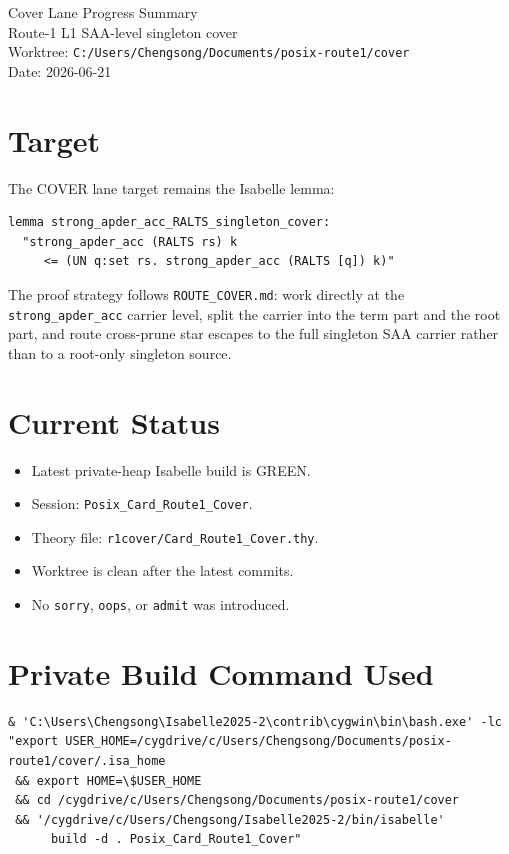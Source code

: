\documentclass[11pt]{article}
\newcommand{\code}[1]{\texttt{\small #1}}
\newcommand{\green}{\textcolor{green!45!black}{GREEN}}
\begin{document}
\begin{center}
  {\LARGE Cover Lane Progress Summary}\\[0.25em]
  {\large Route-1 L1 SAA-level singleton cover}\\[0.25em]
  {\small Worktree: \code{C:/Users/Chengsong/Documents/posix-route1/cover}}\\
  {\small Date: 2026-06-21}
\end{center}

\section*{Target}

The COVER lane target remains the Isabelle lemma:

\begin{verbatim}
lemma strong_apder_acc_RALTS_singleton_cover:
  "strong_apder_acc (RALTS rs) k
     <= (UN q:set rs. strong_apder_acc (RALTS [q]) k)"
\end{verbatim}

The proof strategy follows \code{ROUTE\_COVER.md}: work directly at the
\code{strong\_apder\_acc} carrier level, split the carrier into the term part
and the root part, and route cross-prune star escapes to the full singleton
SAA carrier rather than to a root-only singleton source.

\section*{Current Status}

\begin{itemize}
  \item Latest private-heap Isabelle build is \green.
  \item Session: \code{Posix\_Card\_Route1\_Cover}.
  \item Theory file: \code{r1cover/Card\_Route1\_Cover.thy}.
  \item Worktree is clean after the latest commits.
  \item No \code{sorry}, \code{oops}, or \code{admit} was introduced.
\end{itemize}

\section*{Private Build Command Used}

\begin{verbatim}
& 'C:\Users\Chengsong\Isabelle2025-2\contrib\cygwin\bin\bash.exe' -lc
"export USER_HOME=/cygdrive/c/Users/Chengsong/Documents/posix-route1/cover/.isa_home
 && export HOME=\$USER_HOME
 && cd /cygdrive/c/Users/Chengsong/Documents/posix-route1/cover
 && '/cygdrive/c/Users/Chengsong/Isabelle2025-2/bin/isabelle'
      build -d . Posix_Card_Route1_Cover"
\end{verbatim}
\end{document}

